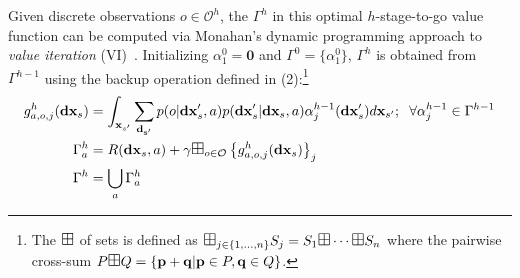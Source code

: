 \documentclass{article} %
\renewcommand{\vec}[1]{\mathbf{#1}} %
\newcommand{\xds}{\mathbf{dx}_s}
\begin{document}
Given discrete observations $o \in \mathcal{O}^h$, the $\Gamma^h$ in
this optimal $h$-stage-to-go value function can be computed via
Monahan's dynamic programming approach to \emph{value iteration}
(VI)~\cite{monahan82}.  Initializing $\alpha^0_1 = \vec{0}$ and
$\Gamma^0 = \{ \alpha^0_1 \}$, $\Gamma^h$ is obtained from
$\Gamma^{h-1}$ using the backup operation defined in (2):\footnote{The
  $\textrm{\large $\boxplus$}$ of sets is defined as $\textrm{\large
    $\boxplus$}_{j \in \{ 1,\ldots, n \} } S_j = S_1 \textrm{\large
    $\boxplus$} \cdots \textrm{\large $\boxplus$} S_n$ where the
  pairwise cross-sum $P \textrm{\large $\boxplus$} Q = \{ \vec{p} +
  \vec{q} | \vec{p} \in P, \vec{q} \in Q \}$.}  
{\footnotesize
\vspace{-1mm}
\begin{align} 
g^h_{a,o,j}(\xds) &=  \int_{\vec{x}_{s'}} \sum_{\vec{d_{s'}}} p(o|\xds',a)p(\xds'|\xds,a) \alpha^{h-1}_j(\xds') d\vec{x}_{s'}; \hspace{2mm}  \forall \alpha^{h-1}_{j} \in \Gamma^{h-1} \label{eq:backup} \\
\Gamma^{h}_a   &= R(\xds,a) + \gamma \textrm{\large $\boxplus$}_{o \in \mathcal{O}} \left\{ g^h_{a,o,j}(\xds) \right\}_j  \label{eq:cross_prod}\\ 
\Gamma^h  &= \bigcup_a \Gamma^h_a 
\end{align}
\vspace{-4mm}
}
\end{document}
